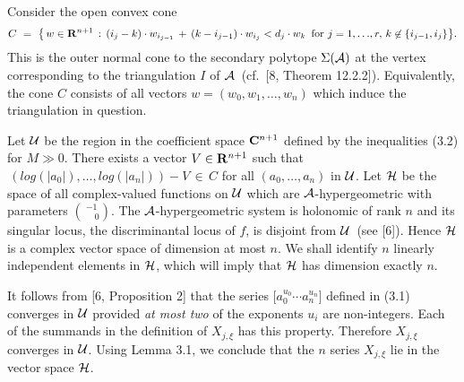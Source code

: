 Consider the open convex cone
$$ C \,\, = \,\, \bigl\{ \,w \in {\bf R}^{n+1} \,:\,
(i_j - k) \cdot w_{i_{j-1}} \, + \,(k - i_{j-1}) \cdot w_{i_j}
 < d_j \cdot w_k \,\,\,
\hbox{for} \,\, j=1,\ldots \!,r, \,
k \not\in \{i_{j-1},i_j \} \bigl\}. $$
This is the outer normal cone to the secondary polytope 
$\Sigma({\cal A})$ at the vertex corresponding to the triangulation 
$I$ of ${\cal A}\,$ (cf.~[8, Theorem 12.2.2]). Equivalently, the 
cone $C$ consists  of all vectors $w = (w_0,w_1,\ldots,w_n)$ 
which induce the triangulation in question.

Let ${\cal U}$ be the region in the coefficient space ${\bf C}^{n+1}$
defined by the inequalities (3.2)
for $M \gg 0$. There exists a vector 
$V \in {\bf R}^{n+1}$ such 
that $\,(log(|a_0|),\ldots,log(|a_n|))-V \,\in \, C $
for all $(a_0,\ldots,a_n)$ in ${\cal U}$. Let ${\cal H}$
be the space of all complex-valued functions on ${\cal U}$
which are ${\cal A}$-hypergeometric with parameters
${-1 \choose \phantom{-} 0 }$. The ${\cal A}$-hypergeometric
system is holonomic of rank $n$ and its singular locus,
the discriminantal locus of $f$,
is disjoint from ${\cal U}\,$ (see [6]). Hence ${\cal H}$ is a
complex vector space of dimension at most $n$.
We shall identify $n$ linearly independent elements 
in ${\cal H}$, which will imply that ${\cal H}$ has dimension exactly $n$.

It follows from [6, Proposition 2] that the series
$\bigl[ a_0^{u_0} \cdots a_n^{u_n} \bigr]$ defined in (3.1) converges 
in ${\cal U}$ provided {\sl at most two} of the exponents $u_i$
are non-integers. Each of the summands in the definition
of $X_{j,\xi}$ has this property. Therefore $X_{j,\xi}$ converges 
in ${\cal U}$. Using Lemma 3.1, we conclude that the $n$ 
series $X_{j,\xi}$ lie in the vector space ${\cal H}$.


